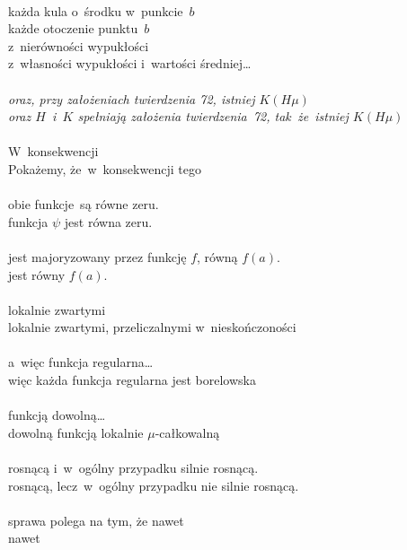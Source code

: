 \documentclass[a4paper,11pt]{article}
\numberwithin{equation}{section}
\begin{document}
 \\
\Jest każda kula o~środku w~punkcie~$b$ \\
\PowinnoByc każde otoczenie punktu~$b$
 \\
\Jest z~nierówności wypukłości \\
\PowinnoByc z~własności wypukłości i~wartości średniej\ldots \\
 \\
\Jest \textit{oraz, przy założeniach twierdzenia 72, istniej
  $K( H \mu )$} \\
\PowinnoByc \textit{oraz $H$~i~$K$ spełniają założenia twierdzenia~72,
  tak~że~istniej $K( H \mu )$}\\
 \\
\Jest W~konsekwencji \\
\PowinnoByc Pokażemy, że~w~konsekwencji tego \\
 \\
\Jest obie funkcje~są równe zeru. \\
\PowinnoByc funkcja $\psi$ jest równa zeru. \\
 \\
\Jest jest majoryzowany przez funkcję $f$, równą $f( a )$. \\
\PowinnoByc jest równy $f( a )$.\\
 \\
\Jest lokalnie zwartymi \\
\PowinnoByc lokalnie zwartymi, przeliczalnymi w~nieskończoności \\
 \\
\Jest a~więc funkcja regularna\ldots \\
\PowinnoByc więc każda funkcja regularna jest borelowska \\
 \\
\Jest funkcją dowolną\ldots \\
\PowinnoByc dowolną funkcją lokalnie $\mu$-całkowalną \\
 \\
\Jest rosnącą i~w~ogólny przypadku silnie rosnącą. \\
\PowinnoByc rosnącą, lecz~w~ogólny przypadku nie silnie rosnącą. \\
 \\
\Jest sprawa polega na tym, że nawet \\
\PowinnoByc nawet \\
\end{document}
